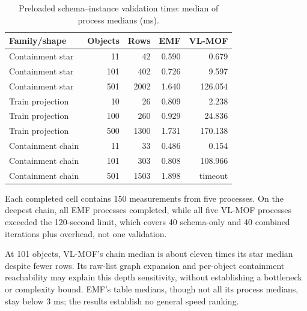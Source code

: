 \begin{table}[!htbp]
\centering
\caption{Preloaded schema--instance validation time: median of process medians (ms).}
\label{tab:validation-times}
\small
\setlength{\tabcolsep}{6pt}
\begin{tabular}{lrrrr}
\hline
Family/shape & Objects & Rows & EMF & VL-MOF \\
\hline
Containment star & 11 & 42 & 0.590 & 0.679 \\
Containment star & 101 & 402 & 0.726 & 9.597 \\
Containment star & 501 & 2002 & 1.640 & 126.054 \\
Train projection & 10 & 26 & 0.809 & 2.238 \\
Train projection & 100 & 260 & 0.929 & 24.836 \\
Train projection & 500 & 1300 & 1.731 & 170.138 \\
Containment chain & 11 & 33 & 0.486 & 0.154 \\
Containment chain & 101 & 303 & 0.808 & 108.966 \\
Containment chain & 501 & 1503 & 1.898 & timeout \\
\hline
\end{tabular}
\end{table}

Each completed cell contains 150 measurements from five processes. On the
deepest chain, all EMF processes completed, while all five VL-MOF processes
exceeded the 120-second limit, which covers 40 schema-only and 40 combined
iterations plus overhead, not one validation.

At 101 objects, VL-MOF's chain median is about eleven times its star median
despite fewer rows. Its raw-list graph expansion and per-object containment
reachability may explain this depth sensitivity, without establishing a bottleneck
or complexity bound. EMF's table medians, though not all its process medians,
stay below 3 ms; the results establish no general speed ranking.
